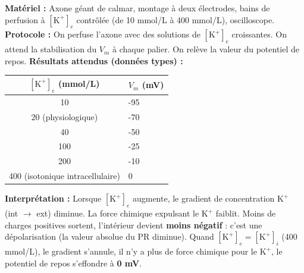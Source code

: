 \documentclass[11pt]{article}
\newcommand{\cle}[1]{{\popxbold\color{popdark}#1}}
\begin{document}
\begin{experience}
\textbf{Matériel :} Axone géant de calmar, montage à deux électrodes, bains de perfusion à $[\text{K}^+]_e$ contrôlée (de 10 mmol/L à 400 mmol/L), oscilloscope.
\textbf{Protocole :} On perfuse l'axone avec des solutions de $[\text{K}^+]_e$ croissantes. On attend la stabilisation du $V_m$ à chaque palier. On relève la valeur du potentiel de repos.
\textbf{Résultats attendus (données types) :}
\begin{center}
\begin{tabularx}{\linewidth}{|c|X|}\hline
\rowcolor{popblueL}
$[\text{K}^+]_e$ (mmol/L) & $V_m$ (mV) \\ \hline
10 & -95 \\ \hline
20 (physiologique) & -70 \\ \hline
40 & -50 \\ \hline
100 & -25 \\ \hline
200 & -10 \\ \hline
400 (isotonique intracellulaire) & 0 \\ \hline
\end{tabularx}
\end{center}
\textbf{Interprétation :} Lorsque $[\text{K}^+]_e$ augmente, le gradient de concentration $\text{K}^+$ (int $\to$ ext) diminue. La force chimique expulsant le $\text{K}^+$ faiblit. Moins de charges positives sortent, l'intérieur devient \textbf{moins négatif} : c'est une \cle{dépolarisation} (la valeur absolue du PR diminue). Quand $[\text{K}^+]_e = [\text{K}^+]_i$ (400 mmol/L), le gradient s'annule, il n'y a plus de force chimique pour le $\text{K}^+$, le potentiel de repos s'effondre à \textbf{0 mV}.
\end{experience}
\end{document}
